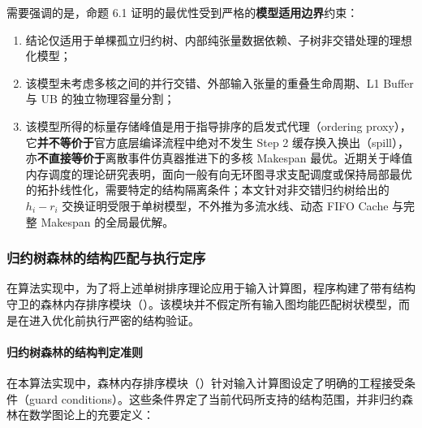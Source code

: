 \documentclass[anonymous,withtoc]{gmcm2026}
\providecommand{\tightlist}{\setlength{\itemsep}{0pt}\setlength{\parskip}{0pt}}
\begin{document}
需要强调的是，命题 6.1 证明的最优性受到严格的\textbf{模型适用边界}约束：

\begin{enumerate}
\def\labelenumi{\arabic{enumi}.}
\tightlist
\item
  结论仅适用于单棵孤立归约树、内部纯张量数据依赖、子树非交错处理的理想化模型；
\item
  该模型未考虑多核之间的并行交错、外部输入张量的重叠生命周期、L1 Buffer 与 UB 的独立物理容量分割；
\item
  该模型所得的标量存储峰值是用于指导排序的启发式代理（ordering proxy），它\textbf{并不等价于}官方底层编译流程中绝对不发生 Step 2 缓存换入换出（spill），亦\textbf{不直接等价于}离散事件仿真器推进下的多核 Makespan 最优。近期关于峰值内存调度的理论研究表明，面向一般有向无环图寻求支配调度或保持局部最优的拓扑线性化，需要特定的结构隔离条件\cite{ref10}；本文针对非交错归约树给出的 \(h_i - r_i\) 交换证明受限于单树模型，不外推为多流水线、动态 FIFO Cache 与完整 Makespan 的全局最优解。
\end{enumerate}

\subsubsection{归约树森林的结构匹配与执行定序}

在算法实现中，为了将上述单树排序理论应用于输入计算图，程序构建了带有结构守卫的森林内存排序模块（\texttt{}）。该模块并不假定所有输入图均能匹配树状模型，而是在进入优化前执行严密的结构验证。

\paragraph{归约树森林的结构判定准则}

在本算法实现中，森林内存排序模块（\texttt{}）针对输入计算图设定了明确的工程接受条件（guard conditions）。这些条件界定了当前代码所支持的结构范围，并非归约森林在数学图论上的充要定义：
\end{document}

